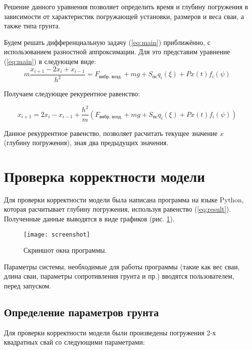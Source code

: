 Решение данного уравнения позволяет определить время и глубину погружения в зависимости от характеристик погружающей
установки, размеров и веса сваи, а также типа грунта.

Будем решать дифференциальную задачу (\ref{eq:main}) приближённо, с использованием разностной аппроксимации.
Для это представим уравнение (\ref{eq:main}) в следующем виде:
\begin{equation}
        m\frac{x_{i+1} - 2x_i + x_{i-1}}{h^2} = F_\text{вибр. возд.} + mg + S_\text{пс} q_i(\xi)+ P x(t) f_i(\psi)
\end{equation}

Получаем следующее рекурентное равенство:

\begin{equation}
    \label{eq:result}
    x_{i+1} = 2x_i - x_{i-1} + \frac{h^2}{m}(F_\text{вибр. возд.} + mg + S_\text{пс} q_i(\xi) + P x(t) f_i(\psi))
\end{equation}

\noindent Данное рекуррентное равенство, позволяет расчитать текущее значение $x$ (глубину погружения), зная два предыдущих значения.

\clearpage

\section{Проверка корректности модели}

Для проверки корректности модели была написана программа на языке Python, которая расчитывает глубину
погружения, используя равенство (\ref{eq:result}). Полученные данные выводятся в виде графиков
(рис. \ref{fig:screenshot}).

\begin{figure}[ht]
    \centering
    \texttt{[image: screenshot]}
    \caption{Скриншот окна программы.}
    \label{fig:screenshot}
\end{figure}

\noindent Параметры системы, необходимые для работы программы (такие как вес сваи, длина сваи, параметры сопротивления грунта
и пр.) вводятся пользователем, перед запуском.

\subsection{Определение параметров грунта}

Для проверки корректности модели были произведены погружения 2-х квадратных свай со следующими параметрами:


